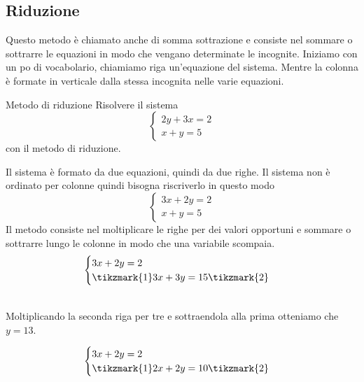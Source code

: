\subsection{Riduzione}
\label{sec:Riduzionesist}
Questo metodo è chiamato anche di somma sottrazione e consiste nel sommare o sottrarre le equazioni in modo che vengano determinate le incognite. Iniziamo con un po di vocabolario, chiamiamo riga un'equazione del sistema. Mentre la colonna è formate in verticale dalla stessa incognita nelle varie equazioni.
\begin{esempiot} {Metodo di riduzione}{}
	Risolvere il sistema \[
	\begin{cases}
	2y+3x=2\\
	x+y=5
	\end{cases}\]
	con il metodo di riduzione.
\end{esempiot}
Il sistema è formato da due equazioni, quindi da due righe. Il sistema non è ordinato per colonne quindi bisogna riscriverlo in questo modo \[
\begin{cases}
3x+2y=2\\
x+y=5
\end{cases}\]
Il metodo consiste nel moltiplicare le righe per dei valori  opportuni e  sommare o sottrarre lungo le colonne in modo che una variabile scompaia.
\[
\begin{cases}
3x+2y=2\\
\tikzmark{1}3x+3y=15\tikzmark{2}
\end{cases}\]
\\

Moltiplicando la seconda riga per tre e sottraendola alla prima otteniamo che $y=13$. 

\[
\begin{cases}
3x+2y=2\\
\tikzmark{1}2x+2y=10\tikzmark{2}
\end{cases}\]

\\

